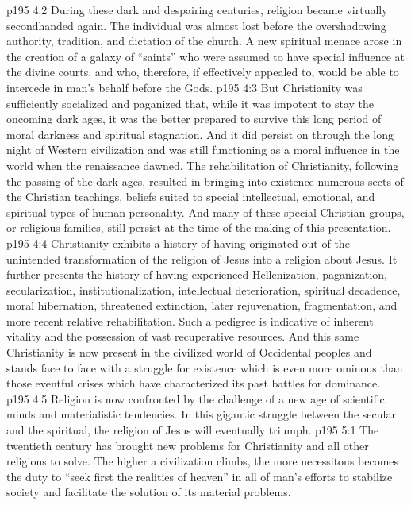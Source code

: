 \vs p195 4:2 During these dark and despairing centuries, religion became virtually secondhanded again. The individual was almost lost before the overshadowing authority, tradition, and dictation of the church. A new spiritual menace arose in the creation of a galaxy of “saints” who were assumed to have special influence at the divine courts, and who, therefore, if effectively appealed to, would be able to intercede in man’s behalf before the Gods.
\vs p195 4:3 But Christianity was sufficiently socialized and paganized that, while it was impotent to stay the oncoming dark ages, it was the better prepared to survive this long period of moral darkness and spiritual stagnation. And it did persist on through the long night of Western civilization and was still functioning as a moral influence in the world when the renaissance dawned. The rehabilitation of Christianity, following the passing of the dark ages, resulted in bringing into existence numerous sects of the Christian teachings, beliefs suited to special intellectual, emotional, and spiritual types of human personality. And many of these special Christian groups, or religious families, still persist at the time of the making of this presentation.
\pc \vs p195 4:4 Christianity exhibits a history of having originated out of the unintended transformation of the religion of Jesus into a religion about Jesus. It further presents the history of having experienced Hellenization, paganization, secularization, institutionalization, intellectual deterioration, spiritual decadence, moral hibernation, threatened extinction, later rejuvenation, fragmentation, and more recent relative rehabilitation. Such a pedigree is indicative of inherent vitality and the possession of vast recuperative resources. And this same Christianity is now present in the civilized world of Occidental peoples and stands face to face with a struggle for existence which is even more ominous than those eventful crises which have characterized its past battles for dominance.
\pc \vs p195 4:5 Religion is now confronted by the challenge of a new age of scientific minds and materialistic tendencies. In this gigantic struggle between the secular and the spiritual, the religion of Jesus will eventually triumph.
\vs p195 5:1 The twentieth century has brought new problems for Christianity and all other religions to solve. The higher a civilization climbs, the more necessitous becomes the duty to “seek first the realities of heaven” in all of man’s efforts to stabilize society and facilitate the solution of its material problems.
